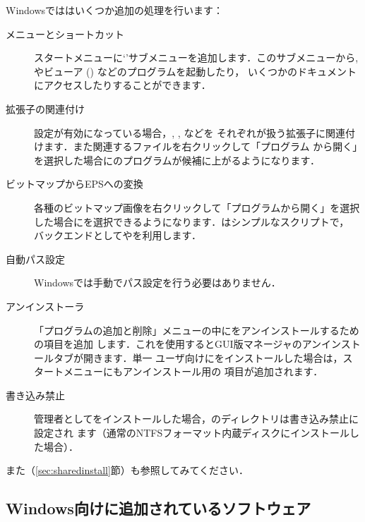\documentclass[uplatex,dvipdfmx]{jsarticle}
\begin{document}
Windowsでは\TL はいくつか追加の処理を行います：
%
\begin{description}
\item[メニューとショートカット]
スタートメニューに`\TL'サブメニューを追加します．このサブメニューから,
や\PS ビューア () などの\GUI プログラムを起動したり，
いくつかのドキュメントにアクセスしたりすることができます．

\item[拡張子の関連付け]
設定が有効になっている場合，, , などを
それぞれが扱う拡張子に関連付けます．また関連するファイルを右クリックして「プログラム
から開く」を選択した場合に\TL のプログラムが候補に上がるようになります．

\item[ビットマップからEPSへの変換]
各種のビットマップ画像を右クリックして「プログラムから開く」を選択した場合にを選択できるようになります．はシンプルなスクリプトで，
バックエンドとしてやを利用します．

\item[自動パス設定]
Windowsでは手動でパス設定を行う必要はありません．

\item[アンインストーラ]
「プログラムの追加と削除」メニューの中に\TL をアンインストールするための項目を追加
します．これを使用するとGUI版\TL マネージャのアンインストールタブが開きます．単一
ユーザ向けに\TL をインストールした場合は，スタートメニューにもアンインストール用の
項目が追加されます．

\item[書き込み禁止]
管理者として\TL をインストールした場合，\TL のディレクトリは書き込み禁止に設定され
ます（通常のNTFSフォーマット内蔵ディスクにインストールした場合）．
\end{description}

また（\ref{sec:sharedinstall}節）も参照してみてください．

\subsection{Windows向けに追加されているソフトウェア}
\end{document}
